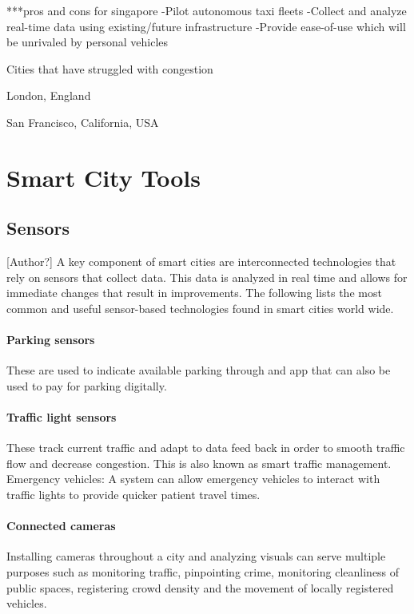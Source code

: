\documentclass[12pt]{article}                         %
\begin{document}
    ***pros and cons for singapore
-Pilot autonomous taxi fleets
-Collect and analyze real-time data using existing/future infrastructure
-Provide ease-of-use which will be unrivaled by personal vehicles

Cities that have struggled with congestion

London, England

San Francisco, California, USA




\section{Smart City Tools}
\subsection{Sensors}[Author?]
A key component of smart cities are interconnected technologies that rely on sensors that collect data. This data is analyzed in real time and allows for immediate changes that result in improvements. The following lists the most common and useful sensor-based technologies found in smart cities world wide. 

\paragraph{Parking sensors} These are used to indicate available parking through and app that can also be used to pay for parking digitally.

\paragraph{Traffic light sensors} These track current traffic and adapt to data feed back in order to smooth traffic flow and decrease congestion. This is also known as smart traffic management.    
Emergency vehicles: A system can allow emergency vehicles to interact with traffic lights to provide quicker patient travel times.

\paragraph{Connected cameras} Installing cameras throughout a city and analyzing visuals can serve multiple purposes such as monitoring traffic, pinpointing crime, monitoring cleanliness of public spaces, registering crowd density and the movement of locally registered vehicles.
\end{document}
